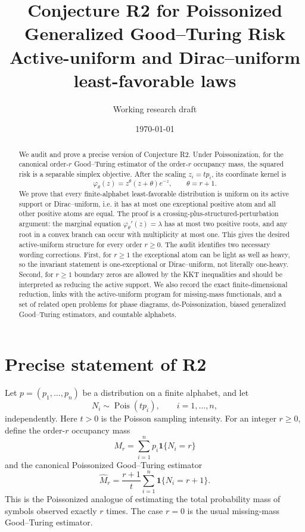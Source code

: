 \documentclass[11pt]{article}
\title{Conjecture R2 for Poissonized Generalized Good--Turing Risk\\
\large Active-uniform and Dirac--uniform least-favorable laws}
\author{Working research draft}
\date{\today}
\theoremstyle{definition}
\newcommand{\one}{\mathbf 1}
\newcommand{\Pois}{\operatorname{Pois}}
\begin{document}
\maketitle

\begin{abstract}
We audit and prove a precise version of Conjecture R2.  Under Poissonization, for the canonical order-$r$ Good--Turing estimator of the order-$r$ occupancy mass, the squared risk is a separable simplex objective.  After the scaling $z_i=t p_i$, its coordinate kernel is
\[
  \varphi_\theta(z)=z^\theta(z+\theta)e^{-z},
  \qquad \theta=r+1.
\]
We prove that every finite-alphabet least-favorable distribution is uniform on its active support or Dirac--uniform, i.e. it has at most one exceptional positive atom and all other positive atoms are equal.  The proof is a crossing-plus-structured-perturbation argument: the marginal equation $\varphi_\theta'(z)=\lambda$ has at most two positive roots, and any root in a convex branch can occur with multiplicity at most one.  This gives the desired active-uniform structure for every order $r\ge0$.  The audit identifies two necessary wording corrections.  First, for $r\ge1$ the exceptional atom can be light as well as heavy, so the invariant statement is one-exceptional or Dirac--uniform, not literally one-heavy.  Second, for $r\ge1$ boundary zeros are allowed by the KKT inequalities and should be interpreted as reducing the active support.  We also record the exact finite-dimensional reduction, links with the active-uniform program for missing-mass functionals, and a set of related open problems for phase diagrams, de-Poissonization, biased generalized Good--Turing estimators, and countable alphabets.
\end{abstract}

\tableofcontents

\section{Precise statement of R2}

Let $p=(p_1,\ldots,p_n)$ be a distribution on a finite alphabet, and let
\[
  N_i\sim\Pois(t p_i),\qquad i=1,\ldots,n,
\]
independently.  Here $t>0$ is the Poisson sampling intensity.  For an integer $r\ge0$, define the order-$r$ occupancy mass
\[
  M_r=\sum_{i=1}^n p_i\one\{N_i=r\}
\]
and the canonical Poissonized Good--Turing estimator
\[
  \widehat M_r=\frac{r+1}{t}\sum_{i=1}^n \one\{N_i=r+1\}.
\]
This is the Poissonized analogue of estimating the total probability mass of symbols observed exactly $r$ times.  The case $r=0$ is the usual missing-mass Good--Turing estimator.
\end{document}
